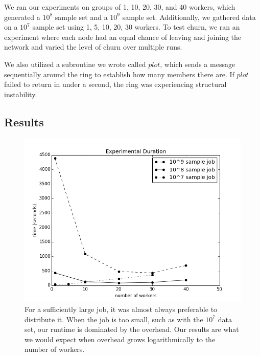 \documentclass[10pt, conference, compsocconf]{IEEEtran}
\begin{document}
We ran our experiments on groups of 1, 10, 20, 30, and 40 workers, which generated a $10^{8}$ sample set and a $10^{9}$ sample set.  Additionally, we gathered data on a $10^{7}$ sample set using 1, 5, 10, 20, 30 workers.  To test churn, we ran an experiment where each node had an equal chance of leaving and joining the network and varied the level of churn over multiple runs.  

We also utilized a subroutine we wrote called $plot$, which sends a message sequentially around the ring to establish how many members there are.  If $plot$ failed to return in under a second, the ring was experiencing structural instability.

\subsection{Results}

\begin{figure}
    \includegraphics[width=\linewidth]{expTime}
    \caption{For a sufficiently large job, it was almost always preferable to distribute it.  When the job is too small, such as with the $10^{7}$ data set, our runtime is dominated by the overhead.  Our results are what we would expect when overhead grows logarithmically to the number of workers.}
    \label{expTime}
\end{figure}
\end{document}
